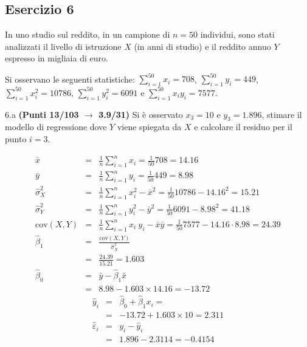 \documentclass[
  11pt,
]{book}
\theoremstyle{mytheoremstyle}
\theoremstyle{mydefstyle}
\newenvironment{sol}
  {
  \begin{tcolorbox}[enhanced,breakable,arc=0.1mm,boxrule=1pt,colback=white,colframe=iblue,
  title=\bf \fontfamily{lmss}\selectfont \hspace{.5 cm} Soluzione,drop fuzzy shadow]

}{
\end{tcolorbox}
  }
\begin{document}
\subsection{Esercizio 6}\label{esercizio-6-37}

In uno studio sul reddito, in un campione di \(n=50\) individui, sono stati analizzati il livello di istruzione \(X\) (in anni di studio) e il reddito annuo \(Y\) espresso in migliaia di euro.

Si osservano le seguenti statistiche:
\(\sum_{i=1}^{50}x_i=708\), \(\sum_{i=1}^{50}y_i=449\),
\(\sum_{i=1}^{50}x_i^2=10786\), \(\sum_{i=1}^{50}y_i^2=6091\) e \(\sum_{i=1}^{50}x_iy_i=7577\).

6.a \textbf{(Punti 13/103 \(\rightarrow\) 3.9/31)} Si è osservato \(x_3=10\) e \(y_3=1.896\), stimare il modello di regressione dove \(Y\) viene spiegata da \(X\) e calcolare il residuo per il punto \(i=3\).

\begin{sol}
\begin{eqnarray*}
           \bar x &=&\frac 1 n\sum_{i=1}^n x_i = \frac {1}{ 50 }  708 =  14.16 \\
           \bar y &=&\frac 1 n\sum_{i=1}^n y_i = \frac {1}{ 50 }  449 =  8.98 \\
           \hat\sigma_X^2&=&\frac 1 n\sum_{i=1}^n x_i^2-\bar x^2=\frac {1}{ 50 }  10786  - 14.16 ^2= 15.21 \\
           \hat\sigma_Y^2&=&\frac 1 n\sum_{i=1}^n y_i^2-\bar y^2=\frac {1}{ 50 }  6091  - 8.98 ^2= 41.18 \\
           \text{cov}(X,Y)&=&\frac 1 n\sum_{i=1}^n x_i~y_i-\bar x\bar y=\frac {1}{ 50 }  7577 - 14.16 \cdot 8.98 = 24.39 \\
           \hat\beta_1 &=& \frac{\text{cov}(X,Y)}{\hat\sigma_X^2} \\
                    &=& \frac{ 24.39 }{ 15.21 }  =  1.603 \\
           \hat\beta_0 &=& \bar y - \hat\beta_1 \bar x\\
                    &=&  8.98 - 1.603 \times  14.16 = -13.72 
         \end{eqnarray*}\begin{eqnarray*}
\hat y_i &=&\hat\beta_0+\hat\beta_1 x_i=\\ 
&=& -13.72 + 1.603 \times 10 = 2.311 \\ 
\hat \varepsilon_i &=& y_i-\hat y_i\\ 
&=& 1.896 - 2.3114 = -0.4154  
\end{eqnarray*}

\end{sol}
\end{document}
